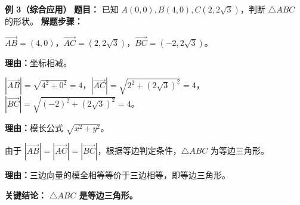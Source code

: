 \begin{examplebox}
	\medskip
	\textbf{\textcolor{CExample}{例 3（综合应用）}}
	\textbf{\textcolor{CExample}{题目：}}
	已知 $A(0,0), B(4,0), C(2,2\sqrt{3})$，判断 $\triangle ABC$ 的形状。
	\textbf{\textcolor{CExample}{解题步骤：}}
	\begin{description}[style=nextline, leftmargin=2.8em, labelsep=0.5em, itemsep=0.45em]
		\item[\textbf{第一步（求向量坐标）：}]
			$\overrightarrow{AB}=(4,0)$，$\overrightarrow{AC}=(2,2\sqrt{3})$，$\overrightarrow{BC}=(-2,2\sqrt{3})$。
			\par\textbf{理由：}坐标相减。
		\item[\textbf{第二步（计算模长）：}]
			$|\overrightarrow{AB}| = \sqrt{4^2+0^2}=4$，$|\overrightarrow{AC}| = \sqrt{2^2+(2\sqrt{3})^2}=4$，$|\overrightarrow{BC}| = \sqrt{(-2)^2+(2\sqrt{3})^2}=4$。
			\par\textbf{理由：}模长公式 $\sqrt{x^2+y^2}$。
		\item[\textbf{第三步（判定形状）：}]
			由于 $|\overrightarrow{AB}| = |\overrightarrow{AC}| = |\overrightarrow{BC}|$，根据等边判定条件，$\triangle ABC$ 为等边三角形。
			\par\textbf{理由：}三边向量的模全相等等价于三边相等，即等边三角形。
	\end{description}
	\textbf{\textcolor{CExample}{关键结论：}}
	\textbf{$\triangle ABC$ 是等边三角形。}
\end{examplebox}

